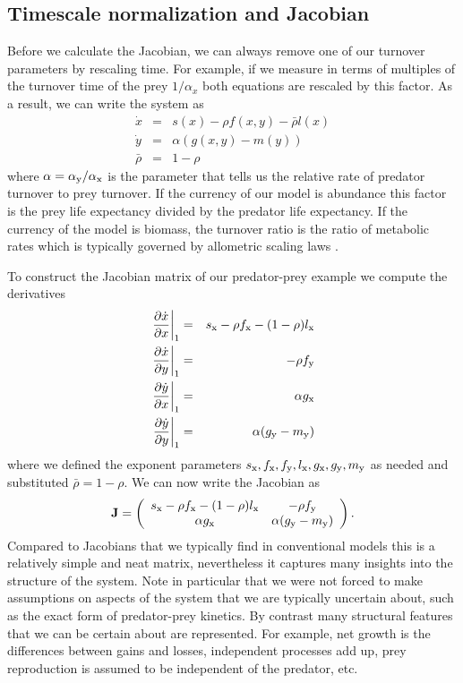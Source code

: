 \documentclass{article}
\newcommand{\eq}[1]{\begin{equation}#1\end{equation}}
\newcommand{\eqa}[1]{\begin{eqnarray}#1\end{eqnarray}}
\newcommand{\avecc}[1]{\left( \begin{array}{c c}#1\end{array} \right)}
\begin{document}
\subsection{Timescale normalization and Jacobian}
Before we calculate the Jacobian, we can always remove one of our turnover parameters by rescaling time. For example, if we measure in terms of multiples of the turnover time of the prey $1/\alpha_{x}$ both equations are rescaled by this factor. As a result, we can write the system as 
\eqa{
\dot{x}&=&s(x)-\rho f(x,y)-\bar{\rho}l(x)\\
\dot{y}&=&\alpha(g(x,y)-m(y))\\
\bar{\rho}&=&1-\rho
}
where $\alpha=\alpha_{\rm y}/\alpha_{\rm x}$ is the parameter that tells us the relative rate of predator turnover to prey turnover. If the currency of our model is abundance this factor is the prey life expectancy divided by the predator life expectancy. If the currency of the model is biomass, the turnover ratio is the ratio of metabolic rates which is typically governed by allometric scaling laws \citep{yeakel2018dynamics}.  
 
To construct the Jacobian matrix of our predator-prey example we compute the derivatives 
\eqa{
\left.\frac{\partial \dot{x}}{\partial x}\right|_1 &=& s_{\rm x}-\rho f_{\rm x} - (1-\rho) l_{\rm x} \\
\left.\frac{\partial \dot{x}}{\partial y}\right|_1 &=& -\rho f_{\rm y} \\
\left.\frac{\partial \dot{y}}{\partial x}\right|_1 &=& \alpha g_{\rm x} \\
\left.\frac{\partial \dot{y}}{\partial y}\right|_1 &=& \alpha (g_{\rm y}-m_{\rm y}) \\
}
where we defined the exponent parameters $s_{\rm x}, f_{\rm x}, f_{\rm y}, l_{\rm x}, g_{\rm x}, g_{\rm y}, m_{\rm y}$ as needed and substituted $\bar{\rho}=1-\rho$. We can now write the Jacobian as 
\eq{
{\bf J} = \avecc{ s_{\rm x}-\rho f_{\rm x} - (1-\rho) l_{\rm x} & -\rho f_{\rm y} \\ \alpha g_{\rm x} & \alpha (g_{\rm y}-m_{\rm y}) }.
}
Compared to Jacobians that we typically find in conventional models this is a relatively simple and neat matrix, nevertheless it captures many insights into the structure of the system. Note in particular that we were not forced to make assumptions on aspects of the system that we are typically uncertain about, such as the exact form of predator-prey kinetics. By contrast many structural features that we can be certain about are represented. For example, net growth is the differences between gains and losses, independent processes add up, prey reproduction is assumed to be independent of the predator, etc. 
\end{document}
